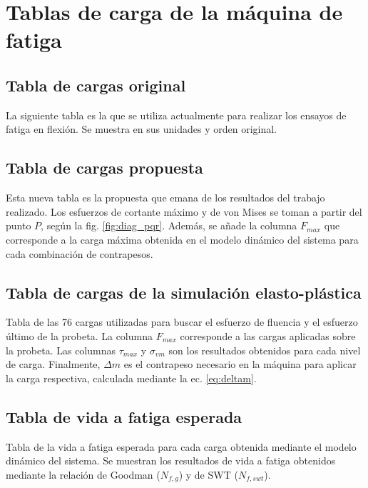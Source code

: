 %
\chapter{Tablas de carga de la máquina de fatiga}
\label{ch:anexo_b}

\section{Tabla de cargas original}
\label{sec:anexob1}

La siguiente tabla es la que se utiliza actualmente para realizar los ensayos de fatiga en flexión. Se muestra en sus unidades y orden original.



\section{Tabla de cargas propuesta}
\label{sec:anexob2}

Esta nueva tabla es la propuesta que emana de los resultados del trabajo realizado. Los esfuerzos de cortante máximo y de von Mises se toman a partir del punto $P$, según la fig. \ref{fig:diag_pqr}. Además, se añade la columna  $F_{max}$ que corresponde a la carga máxima obtenida en el modelo dinámico del sistema para cada combinación de contrapesos.



\section{Tabla de cargas de la simulación elasto-plástica}
\label{sec:anexob3}

Tabla de las 76 cargas utilizadas para buscar el esfuerzo de fluencia y el esfuerzo último de la probeta. La columna $F_{max}$ corresponde a las cargas aplicadas sobre la probeta. Las columnas $\tau_{max}$ y $\sigma_{vm}$ son los resultados obtenidos para cada nivel de carga. Finalmente, $\Delta m$ es el contrapeso necesario en la máquina para aplicar la carga respectiva, calculada mediante la ec. \ref{eq:deltam}.



\section{Tabla de vida a fatiga esperada}
\label{sec:anexob4}

Tabla de la vida a fatiga esperada para cada carga obtenida mediante el modelo dinámico del sistema. Se muestran los resultados de vida a fatiga obtenidos mediante la relación de Goodman ($N_{f,g}$) y de SWT ($N_{f,swt}$).

